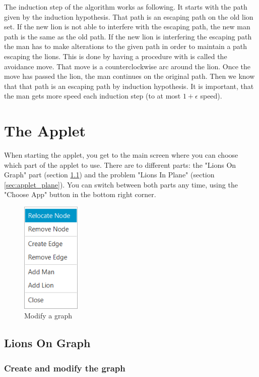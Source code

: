 \documentclass[a4paper]{article}
\begin{document}
The induction step of the algorithm works as following. It starts with the path given by the induction hypothesis. That path is an escaping path on the old lion set. If the new lion is not able to interfere with the escaping path, the new man path is the same as the old path. If the new lion is interfering the escaping path the man has to make alterations to the given path in order to maintain a path escaping the lions. This is done by having a procedure with is called the avoidance move. That move is a counterclockwise arc around the lion. Once the move has passed the lion, the man continues on the original path. Then we know that that path is an escaping path by induction hypothesis. It is important, that the man gets more speed each induction step (to at most $1 + \epsilon$ speed).


\section{The Applet}
When starting the applet, you get to the main screen where you can choose which part of the applet to use. There are to different parts: the "Lions On Graph" part (section \ref{sec:applet_graph}) and the problem "Lions In Plane" (section \ref{sec:applet_plane}). You can switch between both parts any time, using the "Choose App" button in the bottom right corner.

\begin{figure}[hbt]
  \centering
    \includegraphics[width=0.25\textwidth]{modify.png}
  \caption{Modify a graph}
  \label{fig:modify}
\end{figure}

\subsection{Lions On Graph}\label{sec:applet_graph}

\subsubsection*{Create and modify the graph}
\end{document}

